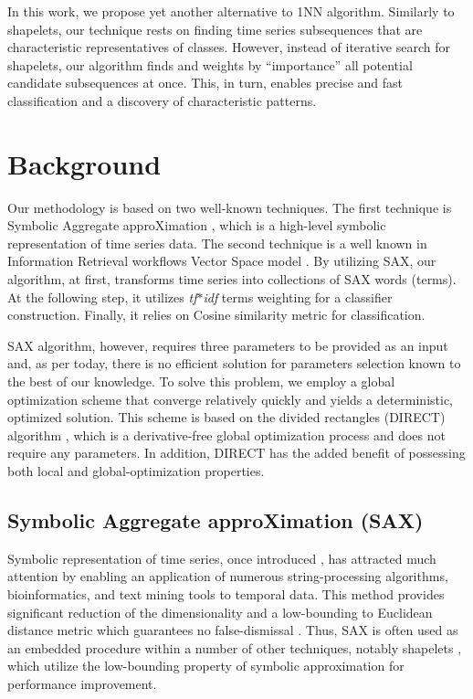 \documentclass{llncs}
\begin{document}
In this work, we propose yet another alternative to 1NN algorithm. Similarly to shapelets, our
technique rests on finding time series subsequences that are characteristic representatives of
classes. However, instead of iterative search for shapelets, our algorithm finds and weights by
``importance'' all potential candidate subsequences at once. This, in turn, enables precise and fast
classification and a discovery of characteristic patterns.

\section{Background}
Our methodology is based on two well-known techniques. The first technique is Symbolic Aggregate
approXimation \cite{sax}, which is a high-level symbolic representation of time series
data. The second technique is a well known in Information Retrieval workflows Vector Space 
model \cite{salton}. By utilizing SAX, our algorithm, at first, transforms time series into
collections of SAX words (terms). 
At the following step, it utilizes \textit{tf$\ast$idf} terms weighting for  a classifier construction. 
Finally, it relies on Cosine similarity metric for classification.

SAX algorithm, however, requires three parameters to be provided as an input and, as per today,
there is no efficient solution for parameters selection known to the best of our knowledge. 
To solve this problem, we employ a global optimization scheme that converge relatively quickly 
and yields a deterministic, optimized solution. 
This scheme is based on the divided rectangles (DIRECT) algorithm \cite{direct}, which is
a derivative-free global optimization process and does not require any parameters.
In addition, DIRECT has the added benefit of possessing both local and global-optimization properties. 

\subsection{Symbolic Aggregate approXimation (SAX)}
Symbolic representation of time series, once introduced \cite{sax}, has attracted much attention by
enabling an application of numerous string-processing algorithms, bioinformatics, and text mining 
tools to temporal data. This method provides significant reduction of the dimensionality and
a low-bounding to Euclidean distance metric which guarantees no false-dismissal \cite{hot_sax}.
Thus, SAX is often used as an embedded procedure within a number of other techniques, notably 
shapelets \cite{fast-shapelets}, which utilize the low-bounding property of symbolic approximation 
for performance improvement.
\end{document}
